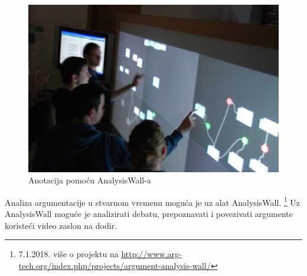 \begin{figure}
\centering
\includegraphics[scale=0.4]{analysis_wall.jpg}
\caption{Anotacija pomoću AnalysisWall-a}
\label{fig:analysiswall}
\end{figure}

Analiza argumentacije u stvarnom vremenu moguća je uz alat AnalysisWall.
\footnote{7.1.2018. više o projektu na \url{http://www.arg-tech.org/index.php/projects/argument-analysis-wall/}}
Uz AnalysisWall moguće je analizirati debatu, prepoznavati i povezivati argumente 
koristeći video zaslon na dodir. 
